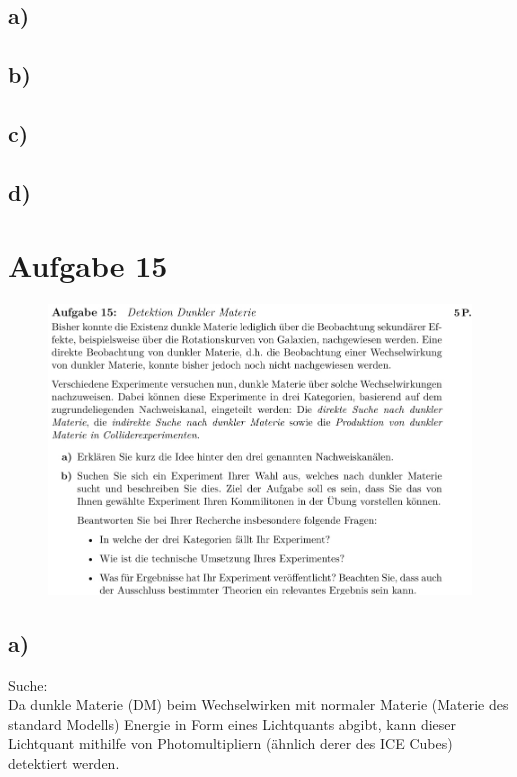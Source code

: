 \subsection{a)}


\subsection{b)}

\subsection{c)}

\subsection{d)}

\section{Aufgabe 15}

    \begin{figure}[H]
        \centering
        \includegraphics[width=\textwidth]{images/Aufgabe15.jpg}
        \label{fig:4}
    \end{figure}

\subsection{a)}

    \justifying Suche:\\
    Da dunkle Materie (DM) beim Wechselwirken mit normaler Materie (Materie des standard Modells) Energie in Form eines Lichtquants abgibt, kann dieser Lichtquant
    mithilfe von Photomultipliern (ähnlich derer des ICE Cubes) detektiert werden.

